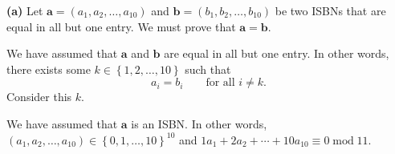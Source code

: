 \documentclass[paper=a4, fontsize=12pt]{scrartcl}%
\theoremstyle{plainsl}
\theoremstyle{definition}
\theoremstyle{remark}
\begin{document}
\textbf{(a)} Let $\mathbf{a}=\left(  a_{1},a_{2},\ldots,a_{10}\right)  $ and
$\mathbf{b}=\left(  b_{1},b_{2},\ldots,b_{10}\right)  $ be two ISBNs that are
equal in all but one entry. We must prove that $\mathbf{a}=\mathbf{b}$.

We have assumed that $\mathbf{a}$ and $\mathbf{b}$ are equal in all but one
entry. In other words, there exists some $k\in\left\{  1,2,\ldots,10\right\}
$ such that
\begin{equation}
a_{i}=b_{i}\qquad\text{for all }i\neq k. \label{sol.ent.isbn.a.ass}%
\end{equation}
Consider this $k$.

We have assumed that $\mathbf{a}$ is an ISBN. In other words, $\left(
a_{1},a_{2},\ldots,a_{10}\right)  \in\left\{  0,1,\ldots,10\right\}  ^{10}$
and $1a_{1}+2a_{2}+\cdots+10a_{10}\equiv0\operatorname{mod}11$.
\end{document}
